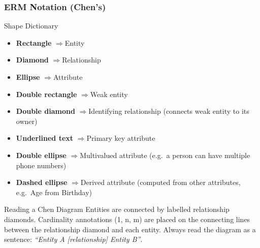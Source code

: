 \begin{frame}
  \frametitle{ERM Notation (Chen's)}

  \begin{block}{Shape Dictionary}
    \begin{itemize}
      \item \textbf{Rectangle} \quad$\Rightarrow$\quad Entity
      \item \textbf{Diamond} \quad$\Rightarrow$\quad Relationship
      \item \textbf{Ellipse} \quad$\Rightarrow$\quad Attribute
      \item \textbf{Double rectangle} \quad$\Rightarrow$\quad Weak entity
      \item \textbf{Double diamond} \quad$\Rightarrow$\quad Identifying relationship (connects weak entity to its owner)
      \item \textbf{Underlined text} \quad$\Rightarrow$\quad Primary key attribute
      \item \textbf{Double ellipse} \quad$\Rightarrow$\quad Multivalued attribute (e.g.\ a person can have multiple phone numbers)
      \item \textbf{Dashed ellipse} \quad$\Rightarrow$\quad Derived attribute (computed from other attributes, e.g.\ Age from Birthday)
    \end{itemize}
  \end{block}

  \begin{block}{Reading a Chen Diagram}
    Entities are connected by labelled relationship diamonds. Cardinality annotations (1, n, m) are placed on the connecting lines between the relationship diamond and each entity. Always read the diagram as a sentence: \textit{``Entity A [relationship] Entity B''}.
  \end{block}
\end{frame}

